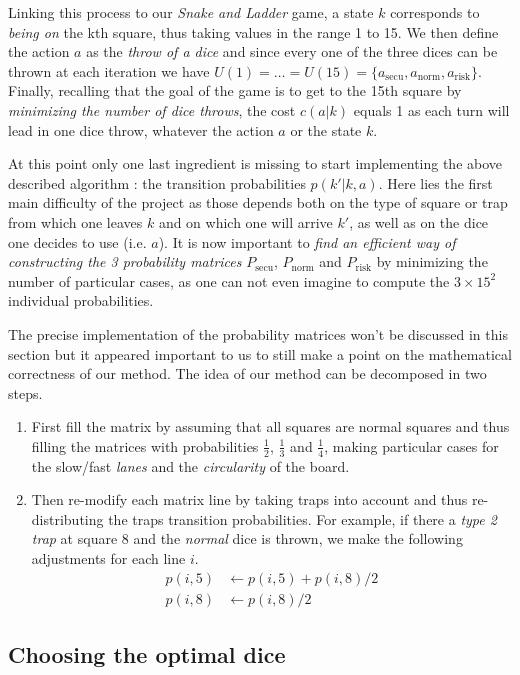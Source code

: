 Linking this process to our \textit{Snake and Ladder} game,
a state $k$ corresponds to \emph{being on} the kth square,
thus taking values in the range 1 to 15.
We then define the action $a$ as the \emph{throw of a dice}
and since every one of the three dices can be thrown at each
iteration we have $U(1) = \dots = U(15) = \{a_{\text{secu}},
a_{\text{norm}}, a_{\text{risk}}\}$.
Finally, recalling that the goal of the game is to get to
the 15th square by \emph{minimizing the number of dice throws},
the cost $c(a|k)$ equals 1 as each turn will lead in one dice
throw, whatever the action $a$ or the state $k$. 

At this point only one last ingredient is missing to start implementing
the above described algorithm : the transition probabilities $p(k'|k,a)$.
Here lies the first main difficulty of the project as those depends
both on the type of square or trap from which one leaves $k$ and
on which one will arrive $k'$, as well as on the dice one
decides to use (i.e. $a$).
It is now important to \emph{find an efficient way of constructing
the 3 probability matrices} $P_{\text{secu}}$, $P_{\text{norm}}$
and $P_{\text{risk}}$ by minimizing the number of particular cases,
as one can not even imagine to compute the $3\times 15^2$ individual probabilities.

The precise implementation of the probability matrices won't be
discussed in this section but it appeared important to us
to still make a point on the mathematical correctness of our method.
The idea of our method can be decomposed in two steps.
\begin{enumerate}
  \item First fill the matrix by assuming that
  all squares are normal squares and thus filling the matrices
  with probabilities $\frac{1}{2}$, $\frac{1}{3}$ and $\frac{1}{4}$,
  making particular cases for the slow/fast \emph{lanes}
  and the \emph{circularity} of the board.
  \item Then re-modify each matrix line by taking traps into account
  and thus re-distributing the traps transition probabilities.
  For example, if there a \emph{type 2 trap} at square 8 
  and the \emph{normal} dice is thrown, we make the following adjustments
  for each line $i$.
  \begin{align*}
    p(i,5) &\leftarrow p(i,5) + p(i,8)/2 \\
     p(i,8) &\leftarrow p(i,8)/2
  \end{align*}
\end{enumerate}


\subsection{Choosing the optimal dice} %
\label{sub:choosing_the_optimal_dice}



